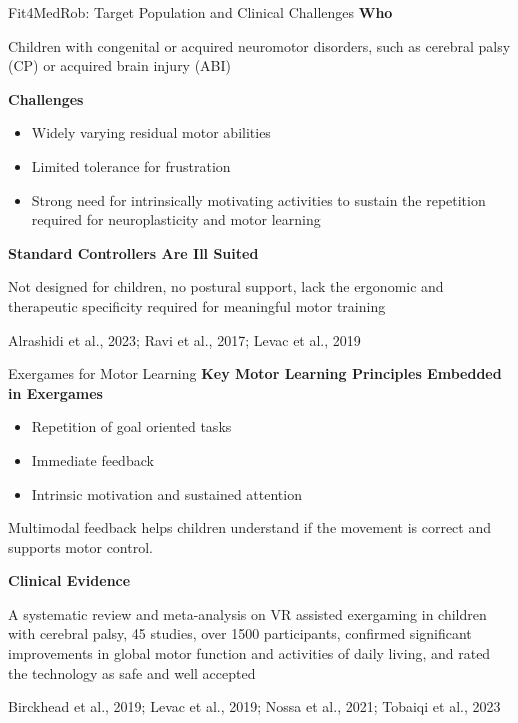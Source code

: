 \documentclass[aspectratio=169, 12pt]{beamer}
\newcommand{\citefooter}[1]{\hfill{\tiny #1}}
\begin{document}
\begin{frame}{Fit4MedRob: Target Population and Clinical Challenges}
	\textbf{\textcolor{gbAqua}{Who}}
	
	Children with congenital or acquired neuromotor disorders, such as cerebral palsy (CP) or acquired brain injury (ABI)
	
	\vspace{0.3cm}
	
	\textbf{\textcolor{gbAqua}{Challenges}}
	
	\begin{itemize}
		\item Widely varying residual motor abilities
		\item Limited tolerance for frustration
		\item Strong need for intrinsically motivating activities to sustain the repetition required for neuroplasticity and motor learning
	\end{itemize}
	
	\vspace{0.3cm}
	
	\textbf{\textcolor{gbAqua}{Standard Controllers Are Ill Suited}}
	
	Not designed for children, no postural support, lack the ergonomic and therapeutic specificity required for meaningful motor training
	
	\citefooter{Alrashidi et al., 2023; Ravi et al., 2017; Levac et al., 2019}
\end{frame}

\begin{frame}{Exergames for Motor Learning}
	\textbf{\textcolor{gbAqua}{Key Motor Learning Principles Embedded in Exergames}}
	
	\begin{itemize}
		\item Repetition of goal oriented tasks
		\item Immediate feedback
		\item Intrinsic motivation and sustained attention
	\end{itemize}
	
	\vspace{0.2cm}
	
	Multimodal feedback helps children understand if the movement is correct and supports motor control.
	
	\vspace{0.3cm}
	
	\textbf{\textcolor{gbAqua}{Clinical Evidence}}
	
	A systematic review and meta-analysis on VR assisted exergaming in children with cerebral palsy, \alert{45 studies, over 1500 participants}, confirmed significant improvements in global motor function and activities of daily living, and rated the technology as safe and well accepted
	
	\citefooter{Birckhead et al., 2019; Levac et al., 2019; Nossa et al., 2021; Tobaiqi et al., 2023}
\end{frame}
\end{document}
